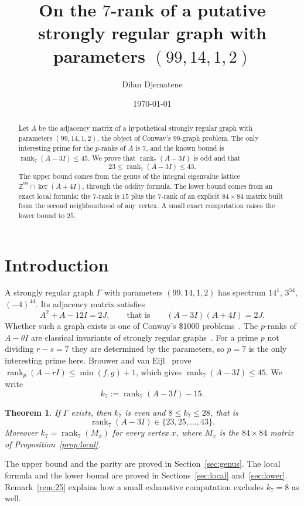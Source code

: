 \documentclass[11pt]{amsart}
\title[The $7$-rank of a putative $\mathrm{srg}(99,14,1,2)$]{On the $7$-rank of a putative strongly regular graph with parameters $(99,14,1,2)$}
\author{Dilan Djematene}
\date{\today}
\newtheorem{theorem}{Theorem}
\theoremstyle{remark}
\newcommand{\Z}{\mathbb{Z}}
\DeclareMathOperator{\rk}{rank}
\begin{document}
\begin{abstract}
Let $A$ be the adjacency matrix of a hypothetical strongly regular graph with parameters $(99,14,1,2)$, the
object of Conway's $99$-graph problem. The only interesting prime for the $p$-ranks of $A$ is $7$, and the known
bound is $\rk_7(A-3I)\le 45$. We prove that $\rk_7(A-3I)$ is odd and that
\[
23\le\rk_7(A-3I)\le 43 .
\]
The upper bound comes from the genus of the integral eigenvalue lattice $\Z^{99}\cap\ker(A+4I)$, through the oddity
formula. The lower bound comes from an exact local formula: the $7$-rank is $15$ plus the $7$-rank of an explicit
$84\times84$ matrix built from the second neighbourhood of any vertex. A small exact computation raises the lower bound
to $25$.
\end{abstract}
\maketitle

\section{Introduction}
A strongly regular graph $\Gamma$ with parameters $(99,14,1,2)$ has spectrum $14^1$, $3^{54}$, $(-4)^{44}$. Its
adjacency matrix satisfies
\begin{equation}\label{eq:quad}
A^2+A-12I=2J,\qquad\text{that is}\qquad (A-3I)(A+4I)=2J .
\end{equation}
Whether such a graph exists is one of Conway's \$1000 problems~\cite{Con}. The $p$-ranks of $A-\theta I$ are classical
invariants of strongly regular graphs~\cite{BvE}. For a prime $p$ not dividing $r-s=7$ they are determined by the
parameters, so $p=7$ is the only interesting prime here. Brouwer and van Eijl~\cite{BvE} prove
$\rk_p(A-rI)\le\min(f,g)+1$, which gives $\rk_7(A-3I)\le 45$. We write
\[
k_7:=\rk_7(A-3I)-15 .
\]

\begin{theorem}\label{thm:main}
If $\Gamma$ exists, then $k_7$ is even and $8\le k_7\le 28$, that is
\[
\rk_7(A-3I)\in\{23,25,\dots,43\}.
\]
Moreover $k_7=\rk_7(M_x)$ for every vertex $x$, where $M_x$ is the $84\times84$ matrix of Proposition~\ref{prop:local}.
\end{theorem}

The upper bound and the parity are proved in Section~\ref{sec:genus}. The local formula and the lower bound are proved in
Sections~\ref{sec:local} and~\ref{sec:lower}. Remark~\ref{rem:25} explains how a small exhaustive computation excludes
$k_7=8$ as well.
\end{document}
